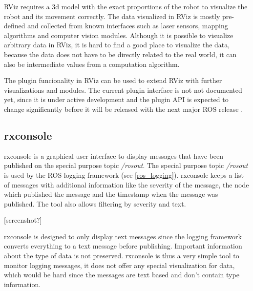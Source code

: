 

RViz requires a 3d model with the exact proportions of the robot to visualize the robot and its movement correctly. The data visualized in RViz is mostly pre-defined and collected from known interfaces such as laser sensors, mapping algorithms and computer vision modules. Although it is possible to visualize arbitrary data in RViz, it is hard to find a good place to visualize the data, because the data does not have to be directly related to the real world, it can also be intermediate values from a computation algorithm.

The plugin funcionality in RViz can be used to extend RViz with further visualizations and modules. The current plugin interface is not not documented yet, since it is under active development and the plugin API is expected to change significantly before it will be released with the next major ROS release \cite{rvizPlugin}.

\subsection{rxconsole}
rxconsole is a graphical user interface to display messages that have been published on the special purpose topic \emph{/rosout}. The special purpose topic \emph{/rosout} is used by the ROS logging framework (see \ref{ros_logging}). rxconsole keeps a list of messages with additional information like the severity of the message, the node which published the message and the timestamp when the message was published. The tool also allows filtering by severity and text.

[screenshot?]

rxconsole is designed to only display text messages since the logging framework converts everything to a text message before publishing. Important information about the type of data is not preserved. rxconsole is thus a very simple tool to monitor logging messages, it does not offer any special visualization for data, which would be hard since the messages are text based and don't contain type information.

